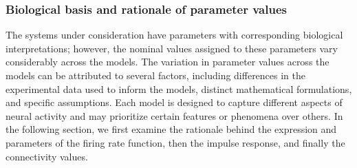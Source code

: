 \documentclass[12pt,twoside]{article}
\begin{document}


\subsubsection{Biological basis and rationale of parameter values}
The systems under consideration have parameters with corresponding biological interpretations; however, the nominal values assigned to these parameters vary considerably across the models. The variation in parameter values across the models can be attributed to several factors, including differences in the experimental data used to inform the models, distinct mathematical formulations, and specific assumptions. Each model is designed to capture different aspects of neural activity and may prioritize certain features or phenomena over others. In the following section, we first examine the rationale behind the expression and parameters of the firing rate function, then the impulse response, and finally the connectivity values. 

\end{document}
